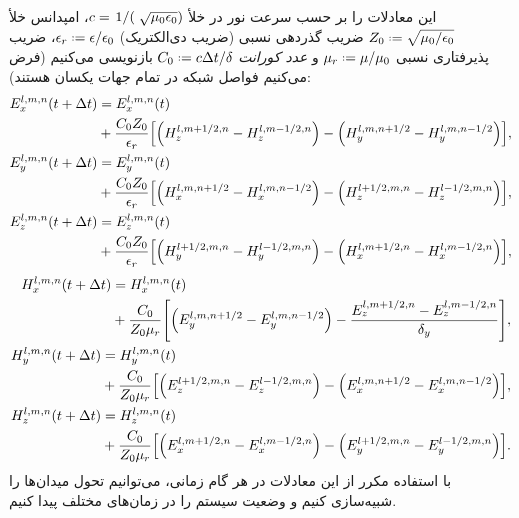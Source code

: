 \documentclass[12pt,a4paper]{article}
\newcommand*{\defeq}{\mathrel{\vcenter{\baselineskip0.5ex \lineskiplimit0pt
						\hbox{\scriptsize.}\hbox{\scriptsize.}}}
						=}
\begin{document}
	این معادلات را بر حسب سرعت نور در خلأ $c=\flatfrac{1}(\sqrt{\mu_0\epsilon_0})$، امپدانس خلأ $Z_0\defeq\sqrt{\mu_0/\epsilon_0}$
	ضریب گذردهی نسبی (ضریب دی‌الکتریک) $\epsilon_r\defeq\epsilon/\epsilon_0 $، ضریب پذیرفتاری نسبی $\mu_r\defeq\mu/\mu_0 $ و
	\emph{عدد کورانت} $C_0\defeq c\Delta{t}/\delta$ بازنویسی می‌کنیم (فرض می‌کنیم فواصل شبکه در تمام جهات یکسان هستند):
	\begin{align}
		\begin{split}
			E_x^{l,m,n}(t + \Delta{t}) &= E_x^{l,m,n}(t) \\
			&+ \frac{C_0 Z_0}{\epsilon_r}\qty[\qty(H_z^{l,m+1/2,n}-H_z^{l,m-1/2,n})-\qty(H_y^{l,m,n+1/2}-H_y^{l,m,n-1/2})],
		\end{split} \\
		\begin{split}
			E_y^{l,m,n}(t + \Delta{t}) &= E_y^{l,m,n}(t) \\
			&+ \frac{C_0 Z_0}{\epsilon_r}\qty[\qty(H_x^{l,m,n+1/2}-H_x^{l,m,n-1/2})-\qty(H_z^{l+1/2,m,n}-H_z^{l-1/2,m,n})], 
		\end{split}\\
		\begin{split}
			E_z^{l,m,n}(t + \Delta{t}) &= E_z^{l,m,n}(t) \\
			&+ \frac{C_0 Z_0}{\epsilon_r}\qty[\qty(H_y^{l+1/2,m,n}-H_y^{l-1/2,m,n})-\qty(H_x^{l,m+1/2,n}-H_x^{l,m-1/2,n})],
		\end{split}
	\end{align}
	\begin{align}
		\begin{split}
			H_x^{l,m,n}(t + \Delta{t}) &= H_x^{l,m,n}(t) \\
			&+ \frac{C_0}{Z_0\mu_r}\qty[\qty(E_y^{l,m,n+1/2}-E_y^{l,m,n-1/2})-\frac{E_z^{l,m+1/2,n}-E_z^{l,m-1/2,n}}{\delta_y}],
		\end{split}\\
		\begin{split}
			H_y^{l,m,n}(t + \Delta{t}) &= H_y^{l,m,n}(t) \\
			&+ \frac{C_0}{Z_0\mu_r}\qty[\qty(E_z^{l+1/2,m,n}-E_z^{l-1/2,m,n})-\qty(E_x^{l,m,n+1/2}-E_x^{l,m,n-1/2})],
		\end{split}\\
		\begin{split}
			H_z^{l,m,n}(t + \Delta{t}) &= H_z^{l,m,n}(t) \\
			&+ \frac{C_0}{Z_0\mu_r}\qty[\qty(E_x^{l,m+1/2,n}-E_x^{l,m-1/2,n})-\qty(E_y^{l+1/2,m,n}-E_y^{l-1/2,m,n})].
		\end{split}
	\end{align}
	با استفاده مکرر از این معادلات در هر گام زمانی، می‌توانیم تحول میدان‌ها را شبیه‌سازی کنیم و وضعیت سیستم را در زمان‌های مختلف پیدا کنیم.
\end{document}
